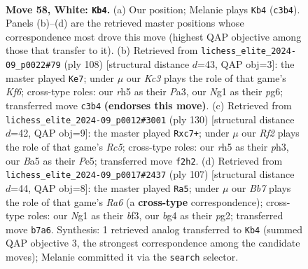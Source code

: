 \documentclass[11pt]{article}
\begin{document}
\clearpage

\begin{figure}[p]\centering
\begin{subfigure}{0.46\textwidth}\centering
\resizebox{\linewidth}{!}{%
\newchessgame
\chessboard[
  setfen={8/1B1k4/8/B6r/P5bp/1PK2p2/5R2/6N1 w - - 10 58},
  showmover=false,
  pgfstyle=straightmove, color=movearrow, markmove={c3-b4}
]}
\caption{}
\end{subfigure}\hfill
\begin{subfigure}{0.46\textwidth}\centering
\resizebox{\linewidth}{!}{%
\newchessgame
\chessboard[
  setfen={8/2R5/3B1Kp1/3k4/p3b2P/P7/6r1/8 w - - 9 55},
  showmover=false,
  pgfstyle=straightmove, color=movearrow, markmove={f6-e7}
]}
\caption{}
\end{subfigure}
\\[4pt]
\begin{subfigure}{0.46\textwidth}\centering
\resizebox{\linewidth}{!}{%
\newchessgame
\chessboard[
  setfen={8/2rk4/6p1/2R1Pb2/1B3P2/7p/7K/8 w - - 0 66},
  showmover=false,
  pgfstyle=straightmove, color=movearrow, markmove={c5-c7}
]}
\caption{}
\end{subfigure}\hfill
\begin{subfigure}{0.46\textwidth}\centering
\resizebox{\linewidth}{!}{%
\newchessgame
\chessboard[
  setfen={8/8/1p5p/1P6/4R3/r3pBb1/2K2kP1/8 b - - 10 54},
  showmover=false,
  pgfstyle=straightmove, color=movearrow, markmove={a3-a5}
]}
\caption{}
\end{subfigure}
\caption{\textbf{Move 58, White: \texttt{Kb4}.} (a) Our position; Melanie plays \texttt{Kb4} (\texttt{c3b4}). Panels (b)--(d) are the retrieved master positions whose correspondence most drove this move (highest QAP objective among those that transfer to it). (b) Retrieved from \texttt{lichess\_elite\_2024-09\_p0022\#79} (ply 108) [structural distance $d$=43, QAP obj=3]: the master played \texttt{Ke7}; under $\mu$ our \emph{Kc3} plays the role of that game's \emph{Kf6}; cross-type roles: our \emph{r}h5 as their \emph{P}a3, our \emph{N}g1 as their \emph{p}g6; transferred move \texttt{c3b4} \textbf{(endorses this move)}. (c) Retrieved from \texttt{lichess\_elite\_2024-09\_p0012\#3001} (ply 130) [structural distance $d$=42, QAP obj=9]: the master played \texttt{Rxc7+}; under $\mu$ our \emph{Rf2} plays the role of that game's \emph{Rc5}; cross-type roles: our \emph{r}h5 as their \emph{p}h3, our \emph{B}a5 as their \emph{P}e5; transferred move \texttt{f2h2}. (d) Retrieved from \texttt{lichess\_elite\_2024-09\_p0017\#2437} (ply 107) [structural distance $d$=44, QAP obj=8]: the master played \texttt{Ra5}; under $\mu$ our \emph{Bb7} plays the role of that game's \emph{Ra6} (a \textbf{cross-type} correspondence); cross-type roles: our \emph{N}g1 as their \emph{b}f3, our \emph{b}g4 as their \emph{p}g2; transferred move \texttt{b7a6}. Synthesis: 1 retrieved analog transferred to \texttt{Kb4} (summed QAP objective 3, the strongest correspondence among the candidate moves); Melanie committed it via the \texttt{search} selector.}
\label{fig:thought-m114}
\end{figure}
\end{document}
